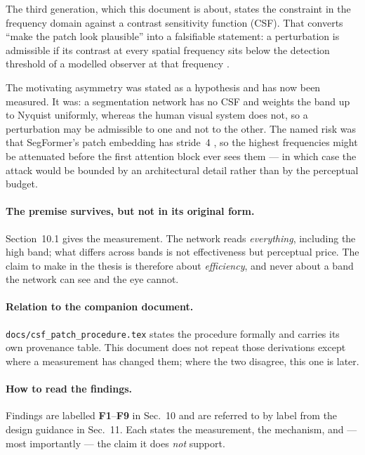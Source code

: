 \documentclass[11pt,a4paper]{article}
\begin{document}
The third generation, which this document is about, states the constraint in
the frequency domain against a contrast sensitivity function (CSF). That
converts ``make the patch look plausible'' into a falsifiable statement: a
perturbation is admissible if its contrast at every spatial frequency sits
below the detection threshold of a modelled observer at that frequency
\citep{campbell1968,barten2003}.

The motivating asymmetry was stated as a hypothesis and has now been
measured. It was: a segmentation network has no CSF and weights the band up
to Nyquist uniformly, whereas the human visual system does not, so a
perturbation may be admissible to one and not to the other. The named risk
was that SegFormer's patch embedding has stride~4 \citep{xie2021segformer},
so the highest frequencies might be attenuated before the first attention
block ever sees them --- in which case the attack would be bounded by an
architectural detail rather than by the perceptual budget.

\paragraph{The premise survives, but not in its original form.}
Section~10.1 gives the measurement. The network reads \emph{everything},
including the high band; what differs across bands is not effectiveness but
perceptual price. The claim to make in the thesis is therefore about
\emph{efficiency}, and never about a band the network can see and the eye
cannot.

\paragraph{Relation to the companion document.}
\texttt{docs/csf\_patch\_procedure.tex} states the procedure formally and
carries its own provenance table. This document does not repeat those
derivations except where a measurement has changed them; where the two
disagree, this one is later.

\paragraph{How to read the findings.}
Findings are labelled \textbf{F1}--\textbf{F9} in Sec.~10 and are referred to
by label from the design guidance in Sec.~11. Each states the measurement,
the mechanism, and --- most importantly --- the claim it does \emph{not}
support.

\end{document}
